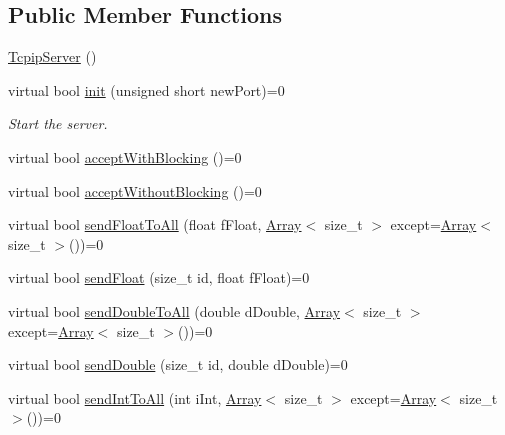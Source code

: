 \subsection*{Public Member Functions}
\begin{DoxyCompactItemize}
\item 
\mbox{\hyperlink{class_rad_j_a_v_1_1_networking_1_1_tcpip_server_ad7121698db184467e9439fe062b5d35a}{Tcpip\+Server}} ()
\item 
virtual bool \mbox{\hyperlink{class_rad_j_a_v_1_1_networking_1_1_tcpip_server_a3d67bcb55aae5c4cc937113c2def86b9}{init}} (unsigned short new\+Port)=0
\begin{DoxyCompactList}\small\item\em Start the server. \end{DoxyCompactList}\item 
virtual bool \mbox{\hyperlink{class_rad_j_a_v_1_1_networking_1_1_tcpip_server_a53555ae267a5f3d6ac8aafbb7a567ee9}{accept\+With\+Blocking}} ()=0
\item 
virtual bool \mbox{\hyperlink{class_rad_j_a_v_1_1_networking_1_1_tcpip_server_a3d7ea19180509cffa6d4ee802767ca90}{accept\+Without\+Blocking}} ()=0
\item 
virtual bool \mbox{\hyperlink{class_rad_j_a_v_1_1_networking_1_1_tcpip_server_acbcaf04e37feb1dd153fcf719a408bc0}{send\+Float\+To\+All}} (float f\+Float, \mbox{\hyperlink{class_rad_j_a_v_1_1_array}{Array}}$<$ size\+\_\+t $>$ except=\mbox{\hyperlink{class_rad_j_a_v_1_1_array}{Array}}$<$ size\+\_\+t $>$())=0
\item 
virtual bool \mbox{\hyperlink{class_rad_j_a_v_1_1_networking_1_1_tcpip_server_a4bfecbdc9651e81b5bb0ac50f17d9063}{send\+Float}} (size\+\_\+t id, float f\+Float)=0
\item 
virtual bool \mbox{\hyperlink{class_rad_j_a_v_1_1_networking_1_1_tcpip_server_a77ef40e188197fd44d7deb4d106c8b72}{send\+Double\+To\+All}} (double d\+Double, \mbox{\hyperlink{class_rad_j_a_v_1_1_array}{Array}}$<$ size\+\_\+t $>$ except=\mbox{\hyperlink{class_rad_j_a_v_1_1_array}{Array}}$<$ size\+\_\+t $>$())=0
\item 
virtual bool \mbox{\hyperlink{class_rad_j_a_v_1_1_networking_1_1_tcpip_server_a646d77a978be8abdfbca26903e8c1f62}{send\+Double}} (size\+\_\+t id, double d\+Double)=0
\item 
virtual bool \mbox{\hyperlink{class_rad_j_a_v_1_1_networking_1_1_tcpip_server_afaa133f1ac712598f54c5eb3f248e163}{send\+Int\+To\+All}} (int i\+Int, \mbox{\hyperlink{class_rad_j_a_v_1_1_array}{Array}}$<$ size\+\_\+t $>$ except=\mbox{\hyperlink{class_rad_j_a_v_1_1_array}{Array}}$<$ size\+\_\+t $>$())=0

\end{DoxyCompactItemize}

